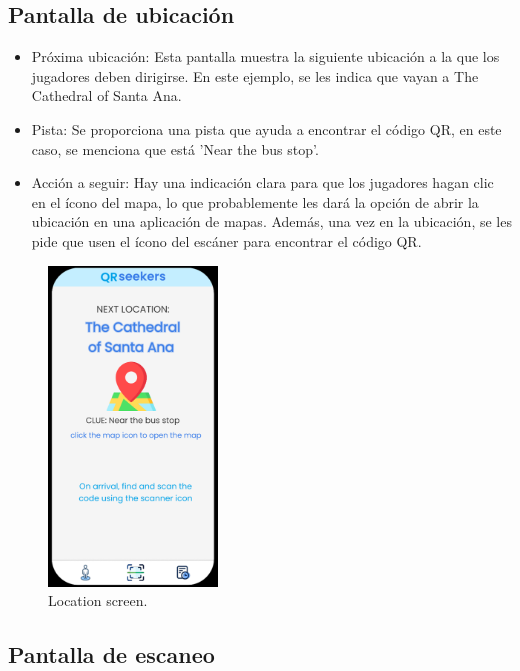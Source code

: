 \documentclass[letterpaper, 12pt]{report}
\begin{document}
\subsection{Pantalla de ubicación}

\begin{itemize}
    \item Próxima ubicación: Esta pantalla muestra la siguiente ubicación a la que los jugadores deben dirigirse. En este ejemplo, se les indica que vayan a The Cathedral of Santa Ana.
    \item Pista: Se proporciona una pista que ayuda a encontrar el código QR, en este caso, se menciona que está 'Near the bus stop'.
    \item Acción a seguir: Hay una indicación clara para que los jugadores hagan clic en el ícono del mapa, lo que probablemente les dará la opción de abrir la ubicación en una aplicación de mapas. Además, una vez en la ubicación, se les pide que usen el ícono del escáner para encontrar el código QR.
\end{itemize}

\begin{figure}[H]
\centering
\includegraphics[width=0.4\textwidth]{figure8.png}
\caption{Location screen.}
\label{fig:1}
\end{figure}

\subsection{Pantalla de escaneo}
\end{document}
